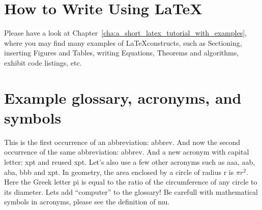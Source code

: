 \section{How to Write Using \LaTeX}
\label{sec:how_to_write_using_latex}

Please have a look at Chapter~\ref{cha:a_short_latex_tutorial_with_examples}, where you may find many examples of \LaTeX constructs, such as Sectioning, inserting Figures and Tables, writing Equations, Theorems and algorithms, exhibit code listings, etc.




\section{Example glossary, acronyms, and symbols}
%
%
This is the first occurrence of an abbreviation: \gls{abbrev}. And now the second occurrence of the same abbreviation: \gls{abbrev}. And a new acronym with capital letter: \Gls{xpt} and reused \gls{xpt}.  Let's also use a few other acronyms such as \gls{aaa}, \gls{aab}, \gls{aba}, \gls{bbb} and \gls{xpt}.
In geometry, the area enclosed by a circle of radius \gls{r} is $\pi r^2$. Here the Greek letter \gls{pi} is equal to the ratio of the circumference of any circle to its diameter.
Lets add ``\gls{computer}'' to the glossary! Be carefull with mathematical symbols in acronyms, please see the definition of \gls{mu}.


%





\endinput


\typeout{NT FILE chapter2.tex}%

